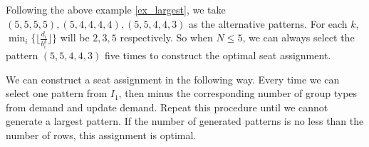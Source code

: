 Following the above example \ref{ex_largest}, we take $(5,5,5,5), (5,4,4,4,4), (5,5,4,4,3)$ as the alternative patterns. For each $k$, $\min_{i} \{\lfloor \frac{d_i}{b_i^k}\rfloor\}$ will be $2,3,5$ respectively. So when $N \leq 5$, we can always select the pattern $(5,5,4,4,3)$ five times to construct the optimal seat assignment.

\begin{prop}\label{prop_I_2}
  We can construct a seat assignment in the following way. Every time we can select one pattern from $I_1$, then minus the corresponding number of group types from demand and update demand. Repeat this procedure until we cannot generate a largest pattern. If the number of generated patterns is no less than the number of rows, this assignment is optimal.
\end{prop}


\newpage
